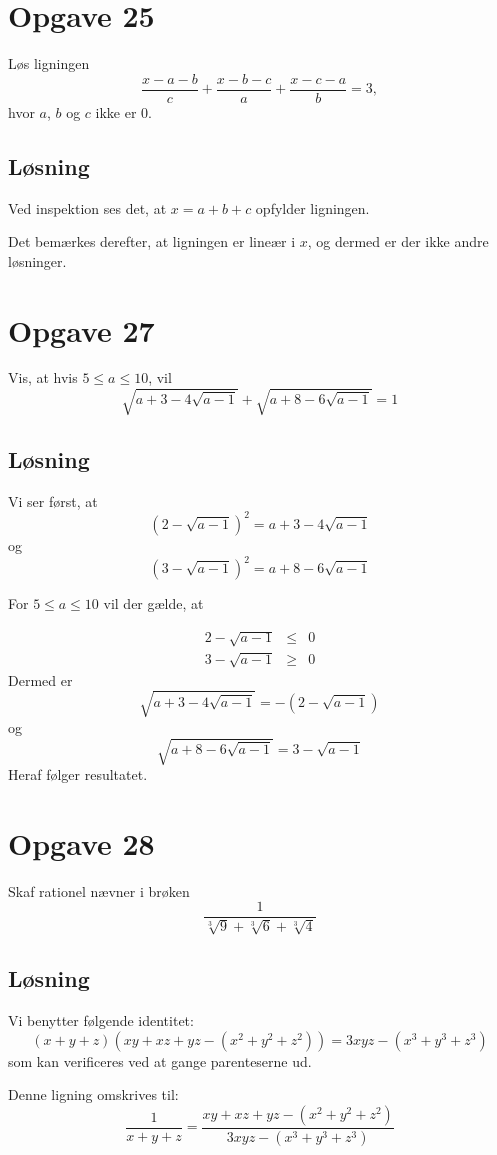 \documentclass[12pt,oneside,a4paper]{article}
\newcommand{\bas}{\begin{eqnarray*}}
\newcommand{\eas}{\end{eqnarray*}}
\begin{document}
\section{Opgave 25}
Løs ligningen
$$
\frac{x-a-b}{c} + \frac{x-b-c}{a} + \frac{x-c-a}{b} = 3,
$$
hvor $a$, $b$ og $c$ ikke er 0.

\subsection{Løsning}
Ved inspektion ses det, at $x=a+b+c$ opfylder ligningen.

Det bemærkes derefter, at ligningen er lineær i $x$, og dermed er der ikke andre løsninger.


\section{Opgave 27}
Vis, at hvis $5\le a\le 10$, vil
$$
\sqrt{a+3-4\sqrt{a-1}} + \sqrt{a+8-6\sqrt{a-1}} = 1
$$

\subsection{Løsning}
Vi ser først, at 
$$
\left(2-\sqrt{a-1}\right)^2 = a+3-4\sqrt{a-1}
$$
og
$$
\left(3-\sqrt{a-1}\right)^2 = a+8-6\sqrt{a-1}
$$

For $5\le a\le 10$ vil der gælde, at

\bas
2-\sqrt{a-1} &\le& 0 \\
3-\sqrt{a-1} &\ge& 0 
\eas
Dermed er
$$
\sqrt{a+3-4\sqrt{a-1}} = -(2-\sqrt{a-1}) 
$$
og 
$$
\sqrt{a+8-6\sqrt{a-1}} = 3-\sqrt{a-1} 
$$
Heraf følger resultatet.



\section{Opgave 28}
Skaf rationel nævner i brøken
$$
\frac{1}{\sqrt[3]9 + \sqrt[3]6 + \sqrt[3]4}
$$

\subsection{Løsning}
Vi benytter følgende identitet:
$$
(x+y+z) \left(xy+xz+yz - (x^2+y^2+z^2)\right) = 3xyz - (x^3+y^3+z^3)
$$
som kan verificeres ved at gange parenteserne ud.

Denne ligning omskrives til:
$$
\frac{1}{x+y+z} = \frac{xy+xz+yz - (x^2+y^2+z^2)}{3xyz - (x^3+y^3+z^3)}
$$
\end{document}
